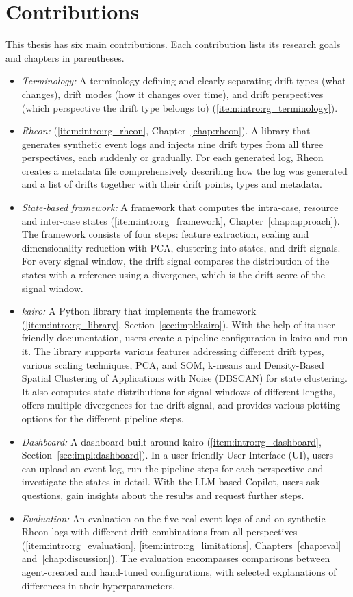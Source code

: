 \section{Contributions}
\label{sec:intro_ssec:contrib}

This thesis has six main contributions. Each contribution lists its research goals and chapters in parentheses.
\begin{itemize}
	\item \emph{Terminology:} A terminology defining and clearly separating drift types (what changes), drift modes (how it changes over time), and drift perspectives (which perspective the drift type belongs to) (\ref{item:intro:rg_terminology}).
	\item \emph{Rheon:} (\ref{item:intro:rg_rheon}, Chapter~\ref{chap:rheon}). A library that generates synthetic event logs and injects nine drift types from all three perspectives, each suddenly or gradually. For each generated log, Rheon creates a metadata file comprehensively describing how the log was generated and a list of drifts together with their drift points, types and metadata.
	\item \emph{State-based framework:} A framework that computes the intra-case, resource and inter-case states (\ref{item:intro:rg_framework}, Chapter~\ref{chap:approach}). The framework consists of four steps: feature extraction, scaling and dimensionality reduction with PCA, clustering into states, and drift signals. For every signal window, the drift signal compares the distribution of the states with a reference using a divergence, which is the drift score of the signal window.
	\item \emph{kairo:} A Python library that implements the framework (\ref{item:intro:rg_library}, Section~\ref{sec:impl:kairo}). With the help of its user-friendly documentation, users create a pipeline configuration in kairo and run it. The library supports various features addressing different drift types, various scaling techniques, PCA, and SOM, k-means and Density-Based Spatial Clustering of Applications with Noise (DBSCAN) for state clustering. It also computes state distributions for signal windows of different lengths, offers multiple divergences for the drift signal, and provides various plotting options for the different pipeline steps.
	\item \emph{Dashboard:} A dashboard built around kairo (\ref{item:intro:rg_dashboard}, Section~\ref{sec:impl:dashboard}). In a user-friendly User Interface (UI), users can upload an event log, run the pipeline steps for each perspective and investigate the states in detail. With the LLM-based Copilot, users ask questions, gain insights about the results and request further steps.
	\item \emph{Evaluation:} An evaluation on the five real event logs of \textcite{padella2026everything} and on synthetic Rheon logs with different drift combinations from all perspectives (\ref{item:intro:rg_evaluation}, \ref{item:intro:rg_limitations}, Chapters~\ref{chap:eval} and~\ref{chap:discussion}). The evaluation encompasses comparisons between agent-created and hand-tuned configurations, with selected explanations of differences in their hyperparameters.
\end{itemize}


